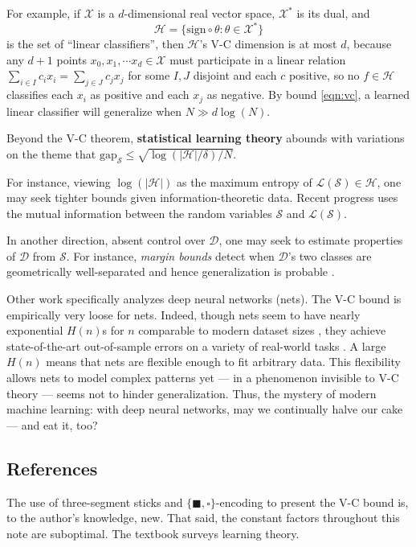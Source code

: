 \documentclass[twocolumn]{article}
\newcommand{\Dd}{\mathcal{D}}
\newcommand{\Hh}{\mathcal{H}}
\newcommand{\Ll}{\mathcal{L}}
\newcommand{\Ss}{\mathcal{S}}
\newcommand{\Xx}{\mathcal{X}}
\newcommand{\Egap}{\text{gap}_{\Ss}}
\theoremstyle{definition}
\begin{document}
        For example, if $\Xx$ is a $d$-dimensional real vector space, $\Xx^*$ is
        its dual, and
        $$
            \Hh = \{
                \text{sign} \circ \theta
                :
                \theta \in \Xx^*
            \}
        $$
        is the set of ``linear classifiers'', then $\Hh$'s V-C dimension 
        is at most $d$, because any $d+1$ points $x_0, x_1,\cdots x_d \in
        \Xx$ must participate in a linear relation
        $
            \sum_{i\in I} c_i x_i
            =
            \sum_{j\in J} c_j x_j
        $
        for some $I,J$ disjoint and each $c$ positive, so no $f\in \Hh$
        classifies each $x_i$ as positive and each $x_j$ as negative.  By bound
        \ref{eqn:vc}, a learned linear classifier will generalize when $N \gg d
        \log(N)$.


        Beyond the V-C theorem, \textbf{statistical
        learning theory} abounds with variations on
        the theme that $\Egap \leq \sqrt{\log(|\Hh|/\delta)/N}$.

        For instance, viewing $\log(|\Hh|)$ as the maximum entropy of $\Ll(\Ss)
        \in \Hh$, one may seek tighter bounds given information-theoretic
        data.  Recent progress \cite{abbe} uses the mutual
        information between the random variables $\Ss$ and $\Ll(\Ss)$.

        In another direction, absent control over $\Dd$, one may seek to
        estimate properties of $\Dd$ from $\Ss$.  For instance, \emph{margin
        bounds} detect when $\Dd$'s two classes are geometrically
        well-separated and hence generalization is probable \cite{mohri}.

        Other work specifically analyzes deep neural networks (nets).  The V-C
        bound is empirically very loose for nets.  Indeed, though nets seem to
        have nearly exponential $H(n)$s for $n$ comparable to modern dataset
        sizes \cite{bengio}, they achieve state-of-the-art out-of-sample errors
        on a variety of real-world tasks \cite{hinton}.  A large $H(n)$ means
        that nets are flexible enough to fit arbitrary data.  This flexibility
        allows nets to model complex patterns yet --- in a phenomenon invisible
        to V-C theory --- seems not to hinder generalization.
        Thus, the mystery of modern machine learning: with deep neural
        networks, may we continually halve our cake --- and eat it, too?

    \subsection*{References}
        The use of three-segment sticks and $\{\blacksquare,
        \square\}$-encoding to present the V-C bound is, to the author's
        knowledge, new.  That said, the constant factors throughout this note
        are suboptimal.  The textbook \cite{mohri} surveys learning theory.
\end{document}
